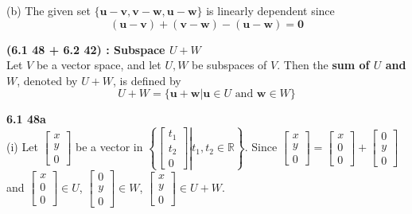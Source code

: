(b) The given set $\{\textbf{u} - \textbf{v}, \textbf{v} - \textbf{w}, \textbf{u} - \textbf{w}\}$ is linearly dependent since \begin{equation*}
	(\textbf{u} - \textbf{v}) + (\textbf{v} - \textbf{w}) - (\textbf{u} - \textbf{w}) = \textbf{0}
\end{equation*}

\textbf{(6.1 48 + 6.2 42) : Subspace $U + W$} \\
Let $V$ be a vector space, and let $U, W$ be subspaces of $V$. Then the \textbf{sum of $U$ and $W$}, denoted by $U + W$, is defined by \begin{equation*}
	U + W = \{\textbf{u} + \textbf{w} \vert \textbf{u} \in U \mbox{ and } \textbf{w} \in W\}
\end{equation*}

\textbf{6.1 48a} \\
(i) Let $\begin{bmatrix}
	x \\ y \\ 0
\end{bmatrix}$ be a vector in $\left\lbrace\left.\begin{bmatrix}
	t_1 \\ t_2 \\ 0
\end{bmatrix} \right\vert t_1, t_2 \in \mathbb{R} \right\rbrace$. Since $
	\begin{bmatrix}
		x \\ y \\ 0
	\end{bmatrix} = \begin{bmatrix}
		x \\ 0 \\ 0
	\end{bmatrix} + \begin{bmatrix}
		0 \\ y \\ 0
	\end{bmatrix}$ and $\begin{bmatrix}
	x \\ 0 \\ 0
\end{bmatrix} \in U$, $\begin{bmatrix}
	0 \\ y \\ 0
\end{bmatrix} \in W$, $\begin{bmatrix}
	x \\ y \\ 0
\end{bmatrix} \in U + W$. \\

